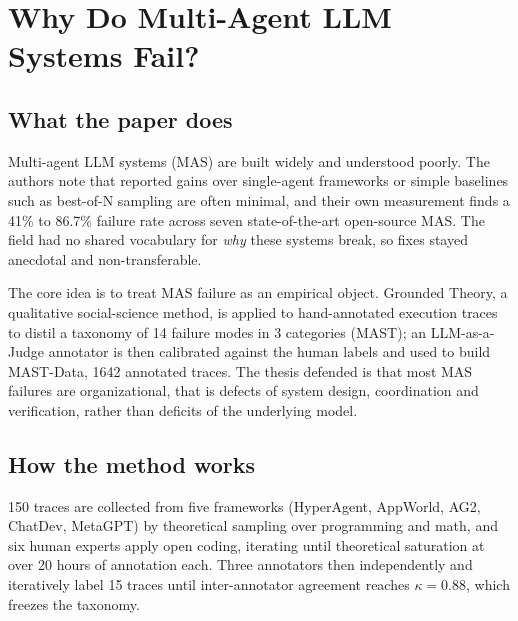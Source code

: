 \section{Why Do Multi-Agent LLM Systems Fail?}

\subsection{What the paper does}

Multi-agent LLM systems (MAS) are built widely and understood poorly. The authors note that reported gains over single-agent frameworks or simple baselines such as best-of-N sampling are often minimal, and their own measurement finds a 41\% to 86.7\% failure rate across seven state-of-the-art open-source MAS. The field had no shared vocabulary for \emph{why} these systems break, so fixes stayed anecdotal and non-transferable.

The core idea is to treat MAS failure as an empirical object. Grounded Theory, a qualitative social-science method, is applied to hand-annotated execution traces to distil a taxonomy of 14 failure modes in 3 categories (MAST); an LLM-as-a-Judge annotator is then calibrated against the human labels and used to build MAST-Data, 1642 annotated traces. The thesis defended is that most MAS failures are organizational, that is defects of system design, coordination and verification, rather than deficits of the underlying model.

\subsection{How the method works}

150 traces are collected from five frameworks (HyperAgent, AppWorld, AG2, ChatDev, MetaGPT) by theoretical sampling over programming and math, and six human experts apply open coding, iterating until theoretical saturation at over 20 hours of annotation each. Three annotators then independently and iteratively label 15 traces until inter-annotator agreement reaches $\kappa = 0.88$, which freezes the taxonomy.

\begin{center}
\end{center}

